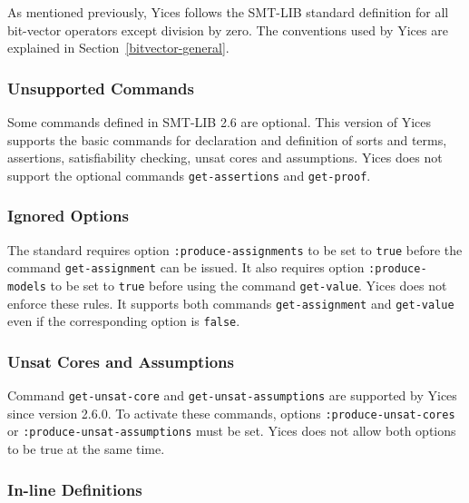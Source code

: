 \documentclass[11pt,twoside,fleqn,openright,titlepage]{cslreport}
\begin{document}
As mentioned previously, Yices follows the SMT-LIB standard definition
for all bit-vector operators except division by zero. The conventions
used by Yices are explained in Section~\ref{bitvector-general}.

\subsubsection*{Unsupported Commands}

Some commands defined in SMT-LIB 2.6 are optional. This version of
Yices supports the basic commands for declaration and definition of
sorts and terms, assertions, satisfiability checking, unsat cores and
assumptions. Yices does not support the optional commands
\texttt{get-assertions} and \texttt{get-proof}.

\subsubsection*{Ignored Options}

The standard requires option \texttt{:produce-assignments} to be set
to \texttt{true} before the command \texttt{get-assignment} can be
issued.  It also requires option \texttt{:produce-models} to be set to
\texttt{true} before using the command \texttt{get-value}. Yices does
not enforce these rules. It supports both commands
\texttt{get-assignment} and \texttt{get-value} even if the
corresponding option is \texttt{false}.

\subsubsection*{Unsat Cores and Assumptions}

Command \texttt{get-unsat-core} and \texttt{get-unsat-assumptions} are
supported by Yices since version 2.6.0. To activate these commands,
options \texttt{:produce-unsat-cores} or
\texttt{:produce-unsat-assumptions} must be set. Yices does not allow
both options to be true at the same time.

\subsubsection*{In-line Definitions}
\end{document}
